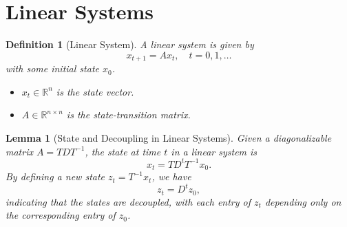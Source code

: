 \documentclass[a4 paper]{article}
\numberwithin{equation}{section}
\theoremstyle{boldStyle}
\theoremstyle{boldBlueStyle}
\newtheorem{lemma}{Lemma}[section]
\theoremstyle{boldPurpleStyle}
\theoremstyle{boldRedStyle}
\newtheorem{definition}{Definition}[section]
\theoremstyle{boldGreenStyle}
\begin{document}
\newpage
\section{Linear Systems}

\begin{definition}[Linear System]
  A linear system is given by
  \begin{equation}
      x_{t+1} = A x_t, \quad t = 0, 1, \ldots
  \end{equation}
  with some initial state \( x_0 \).

  \begin{itemize}
      \item \( x_t \in \mathbb{R}^n \) is the state vector.
      \item \( A \in \mathbb{R}^{n \times n} \) is the state-transition matrix.
  \end{itemize}
\end{definition}

\begin{lemma}[State and Decoupling in Linear Systems]
  Given a diagonalizable matrix \( A = TDT^{-1} \), the state at time \( t \) in a linear system is
  \begin{equation}
      x_t = T D^t T^{-1} x_0.
  \end{equation}
  By defining a new state \( z_t = T^{-1} x_t \), we have
  \begin{equation}
      z_t = D^t z_0,
  \end{equation}
  indicating that the states are decoupled, with each entry of \( z_t \) depending only on the corresponding entry of \( z_0 \).
\end{lemma}
\end{document}
